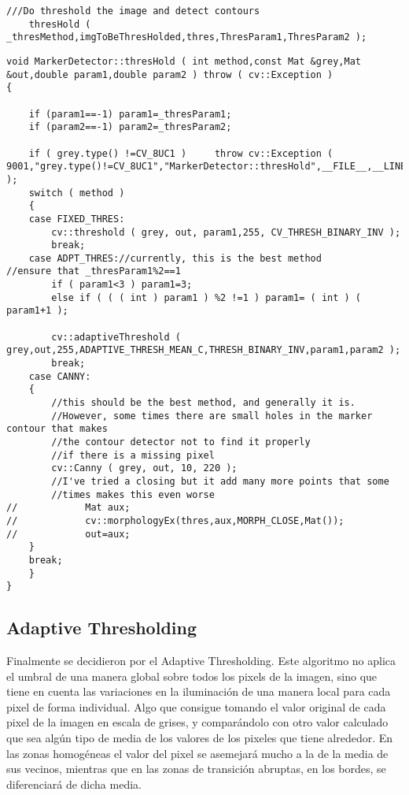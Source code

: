 \documentclass[10pt,a4paper]{article}
\begin{document}
\begin{lstlisting}[style=C++]
  ///Do threshold the image and detect contours
    thresHold ( _thresMethod,imgToBeThresHolded,thres,ThresParam1,ThresParam2 );
\end{lstlisting} 

\begin{lstlisting}[style=C++]  
void MarkerDetector::thresHold ( int method,const Mat &grey,Mat &out,double param1,double param2 ) throw ( cv::Exception )
{

    if (param1==-1) param1=_thresParam1;
    if (param2==-1) param2=_thresParam2;

    if ( grey.type() !=CV_8UC1 )     throw cv::Exception ( 9001,"grey.type()!=CV_8UC1","MarkerDetector::thresHold",__FILE__,__LINE__ );
    switch ( method )
    {
    case FIXED_THRES:
        cv::threshold ( grey, out, param1,255, CV_THRESH_BINARY_INV );
        break;
    case ADPT_THRES://currently, this is the best method
//ensure that _thresParam1%2==1
        if ( param1<3 ) param1=3;
        else if ( ( ( int ) param1 ) %2 !=1 ) param1= ( int ) ( param1+1 );

        cv::adaptiveThreshold ( grey,out,255,ADAPTIVE_THRESH_MEAN_C,THRESH_BINARY_INV,param1,param2 );
        break;
    case CANNY:
    {
        //this should be the best method, and generally it is.
        //However, some times there are small holes in the marker contour that makes
        //the contour detector not to find it properly
        //if there is a missing pixel
        cv::Canny ( grey, out, 10, 220 );
        //I've tried a closing but it add many more points that some
        //times makes this even worse
// 			  Mat aux;
// 			  cv::morphologyEx(thres,aux,MORPH_CLOSE,Mat());
// 			  out=aux;
    }
    break;
    }
}
\end{lstlisting}  

\subsection{Adaptive Thresholding}
Finalmente se decidieron por el Adaptive Thresholding. Este algoritmo no aplica el umbral de una manera global sobre todos los pixels de la imagen, sino que tiene en cuenta las variaciones en la iluminación de una manera local para cada pixel de forma individual. Algo que consigue tomando el valor original de cada pixel de la imagen en escala de grises, y comparándolo con otro valor calculado que sea algún tipo de media de los valores de los pixeles que tiene alrededor. En las zonas homogéneas el valor del pixel se asemejará mucho a la de la media de sus vecinos, mientras que en las zonas de transición abruptas, en los bordes, se diferenciará de dicha media.
\end{document}
